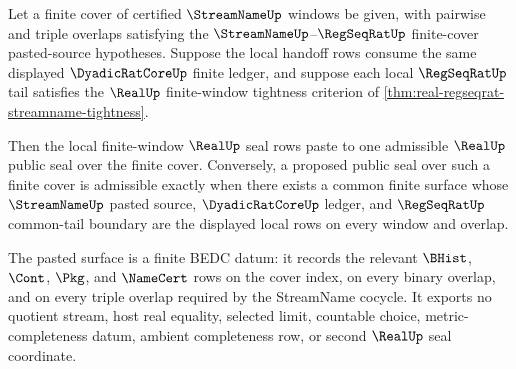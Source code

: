 \begin{theorem}
\label{thm:real-finite-cover-seal-pasting-criterion}
Let a finite cover of certified $\StreamNameUp$ windows be given, with pairwise and triple overlaps satisfying the $\StreamNameUp$--$\RegSeqRatUp$ finite-cover pasted-source hypotheses. Suppose the local handoff rows consume the same displayed $\DyadicRatCoreUp$ finite ledger, and suppose each local $\RegSeqRatUp$ tail satisfies the $\RealUp$ finite-window tightness criterion of \autoref{thm:real-regseqrat-streamname-tightness}.

Then the local finite-window $\RealUp$ seal rows paste to one admissible $\RealUp$ public seal over the finite cover. Conversely, a proposed public seal over such a finite cover is admissible exactly when there exists a common finite surface whose $\StreamNameUp$ pasted source, $\DyadicRatCoreUp$ ledger, and $\RegSeqRatUp$ common-tail boundary are the displayed local rows on every window and overlap.

The pasted surface is a finite BEDC datum: it records the relevant $\BHist$, $\Cont$, $\Pkg$, and $\NameCert$ rows on the cover index, on every binary overlap, and on every triple overlap required by the StreamName cocycle. It exports no quotient stream, host real equality, selected limit, countable choice, metric-completeness datum, ambient completeness row, or second $\RealUp$ seal coordinate.
\end{theorem}
